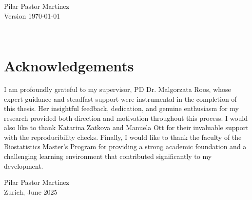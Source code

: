 \documentclass[11pt,a4paper,twoside]{book}
\begin{document}


\graphicspath{{./figure/}}
\setcounter{tocdepth}{1}

\thispagestyle{empty}
\begin{center}
  \vspace*{6cm}{\bfseries\Huge
  Frequentists and Bayesian methods to incorporate 
	recruitment rate stochasticity 
	at the design stage of a clinical trial
  }
  \vfill
  \rm

  \LARGE
  Pilar Pastor Mart\'inez \\[12mm]
  
  \normalsize
  Version \today
\end{center}
\newpage
\thispagestyle{empty}~
\newpage
{}

\chapter*{Acknowledgements}
\thispagestyle{plain}

I am profoundly grateful to my supervisor, PD Dr. Malgorzata Roos, whose expert guidance and steadfast support were instrumental in the completion of this thesis. Her insightful feedback, dedication, and genuine enthusiasm for my research provided both direction and motivation throughout this process.  I would also like to thank Katarina Zatkova and Manuela Ott for their invaluable support with the reproducibility checks. Finally, I would like to thank the faculty of the Biostatistics Master's Program for providing a strong academic foundation and a challenging learning environment that contributed significantly to my development.

\bigskip

\begin{flushright}
  Pilar Pastor Mart\'inez\\
  Zurich, June 2025
\end{flushright}



\thispagestyle{plain}
\tableofcontents
{}


\cleardoublepage
{}
\end{document}
